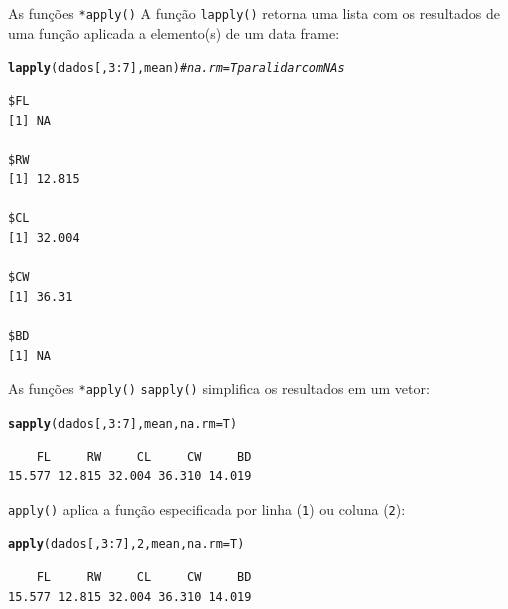 \documentclass[10pt]{beamer}\usepackage[]{graphicx}\usepackage[]{color}
\makeatletter
\newcommand{\hlnum}[1]{\textcolor[rgb]{0.686,0.059,0.569}{#1}}%
\newcommand{\hlcom}[1]{\textcolor[rgb]{0.678,0.584,0.686}{\textit{#1}}}%
\newcommand{\hlopt}[1]{\textcolor[rgb]{0,0,0}{#1}}%
\newcommand{\hlstd}[1]{\textcolor[rgb]{0.345,0.345,0.345}{#1}}%
\newcommand{\hlkwc}[1]{\textcolor[rgb]{0.333,0.667,0.333}{#1}}%
\newcommand{\hlkwd}[1]{\textcolor[rgb]{0.737,0.353,0.396}{\textbf{#1}}}%
\newenvironment{kframe}{%
 \def\at@end@of@kframe{}%
 \ifinner\ifhmode%
  \def\at@end@of@kframe{\end{minipage}}%
  \begin{minipage}{\columnwidth}%
 \fi\fi%
 \def\FrameCommand##1{\hskip\@totalleftmargin \hskip-\fboxsep
 \colorbox{shadecolor}{##1}\hskip-\fboxsep
     \hskip-\linewidth \hskip-\@totalleftmargin \hskip\columnwidth}%
 \MakeFramed {\advance\hsize-\width
   \@totalleftmargin\z@ \linewidth\hsize
   \@setminipage}}%
 {\par\unskip\endMakeFramed%
 \at@end@of@kframe}
\newenvironment{knitrout}{}{} %
\makeatother
\begin{document}
\begin{frame}[fragile]{As funções \texttt{*apply()}}
A função \texttt{lapply()} retorna uma lista com os resultados de uma
função aplicada a elemento(s) de um data frame:
\begin{knitrout}\small
{}\color{fgcolor}\begin{kframe}
\begin{alltt}
\hlkwd{lapply}\hlstd{(dados[,} \hlnum{3}\hlopt{:}\hlnum{7}\hlstd{], mean)} \hlcom{# na.rm = T para lidar com NAs}
\end{alltt}
\begin{verbatim}
$FL
[1] NA

$RW
[1] 12.815

$CL
[1] 32.004

$CW
[1] 36.31

$BD
[1] NA
\end{verbatim}
\end{kframe}
\end{knitrout}
\end{frame}

\begin{frame}[fragile]{As funções \texttt{*apply()}}
\texttt{sapply()} simplifica os resultados em um vetor:
\begin{knitrout}\small
{}\color{fgcolor}\begin{kframe}
\begin{alltt}
\hlkwd{sapply}\hlstd{(dados[,} \hlnum{3}\hlopt{:}\hlnum{7}\hlstd{], mean,} \hlkwc{na.rm} \hlstd{= T)}
\end{alltt}
\begin{verbatim}
    FL     RW     CL     CW     BD 
15.577 12.815 32.004 36.310 14.019 
\end{verbatim}
\end{kframe}
\end{knitrout}
\texttt{apply()} aplica a função especificada por linha (\texttt{1}) ou
coluna (\texttt{2}):
\begin{knitrout}\small
{}\color{fgcolor}\begin{kframe}
\begin{alltt}
\hlkwd{apply}\hlstd{(dados[,} \hlnum{3}\hlopt{:}\hlnum{7}\hlstd{],} \hlnum{2}\hlstd{, mean,} \hlkwc{na.rm}\hlstd{=T)}
\end{alltt}
\begin{verbatim}
    FL     RW     CL     CW     BD 
15.577 12.815 32.004 36.310 14.019 
\end{verbatim}
\end{kframe}
\end{knitrout}
\end{frame}
\end{document}
